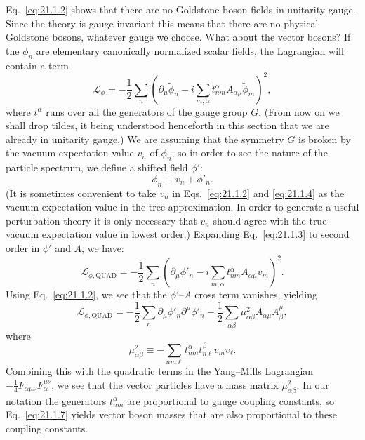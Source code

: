 Eq.~\eqref{eq:21.1.2} shows that there are no Goldstone boson fields in
unitarity gauge. Since the theory is gauge-invariant this means that there
are no physical Goldstone bosons, whatever gauge we choose. What about the
vector bosons? If the $\phi_n$ are elementary canonically normalized scalar
fields, the Lagrangian will contain a term
\begin{equation}
 \mathcal L_\phi
 =-\frac12\sum_n\left(
 \partial_\mu\widetilde{\phi}_n
 -i\sum_{m,\alpha}t^\alpha_{nm}A_{\alpha\mu}
 \widetilde{\phi}_m\right)^2,
 \tag{21.1.3}\label{eq:21.1.3}
\end{equation}
where $t^\alpha$ runs over all the generators of the gauge group $G$.
(From now on we shall drop tildes, it being understood henceforth in this
section that we are already in unitarity gauge.) We are assuming that the
symmetry $G$ is broken by the vacuum expectation value $v_n$ of $\phi_n$,
so in order to see the nature of the particle spectrum, we define a shifted
field $\phi'$:
\begin{equation}
 \phi_n\equiv v_n+\phi'_n.
 \tag{21.1.4}\label{eq:21.1.4}
\end{equation}
(It is sometimes convenient to take $v_n$ in Eqs.~\eqref{eq:21.1.2} and
\eqref{eq:21.1.4} as the vacuum expectation value in the tree
approximation. In order to generate a useful perturbation theory it is only
necessary that $v_n$ should agree with the true vacuum expectation value in
lowest order.) Expanding Eq.~\eqref{eq:21.1.3} to second order in $\phi'$
and $A$, we have:
\begin{equation}
 \mathcal L_{\phi,\mathrm{QUAD}}
 =-\frac12\sum_n\left(
 \partial_\mu\phi'_n
 -i\sum_{m,\alpha}t^\alpha_{nm}A_{\alpha\mu}v_m\right)^2.
 \tag{21.1.5}\label{eq:21.1.5}
\end{equation}
Using Eq.~\eqref{eq:21.1.2}, we see that the $\phi'$--$A$ cross term
vanishes, yielding
\begin{equation}
 \mathcal L_{\phi,\mathrm{QUAD}}
 =-\frac12\sum_n\partial_\mu\phi'_n\partial^\mu\phi'_n
 -\frac12\sum_{\alpha\beta}\mu^2_{\alpha\beta}
 A_{\alpha\mu}A_\beta^\mu,
 \tag{21.1.6}\label{eq:21.1.6}
\end{equation}
where
\begin{equation}
 \mu^2_{\alpha\beta}
 \equiv-\sum_{nm\ell}t^\alpha_{nm}t^\beta_{n\ell}v_mv_\ell.
 \tag{21.1.7}\label{eq:21.1.7}
\end{equation}
Combining this with the quadratic terms in the Yang--Mills Lagrangian
$-\frac14F_{\alpha\mu\nu}F_\alpha^{\mu\nu}$, we see that the vector
particles have a mass matrix $\mu^2_{\alpha\beta}$. In our notation the
generators $t^\alpha_{nm}$ are proportional to gauge coupling constants, so
Eq.~\eqref{eq:21.1.7} yields vector boson masses that are also proportional
to these coupling constants.

